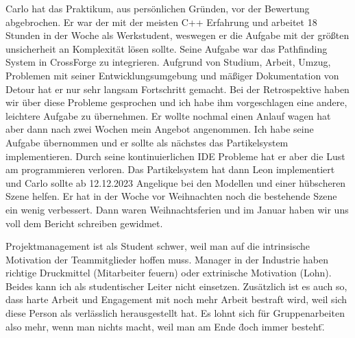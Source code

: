 Carlo hat das Praktikum, aus persönlichen Gründen, vor der Bewertung abgebrochen. Er war der mit der meisten C++ Erfahrung und arbeitet 18 Stunden in der Woche als Werkstudent, weswegen er die Aufgabe mit der größten unsicherheit an Komplexität lösen sollte. Seine Aufgabe war das Pathfinding System in CrossForge zu integrieren. Aufgrund von Studium, Arbeit, Umzug, Problemen mit seiner Entwicklungsumgebung und mäßiger Dokumentation von Detour hat er nur sehr langsam Fortschritt gemacht.  Bei der Retrospektive haben wir über diese Probleme gesprochen und ich habe ihm vorgeschlagen eine andere, leichtere Aufgabe zu übernehmen. Er wollte nochmal einen Anlauf wagen hat aber dann nach zwei Wochen mein Angebot angenommen. Ich habe seine Aufgabe übernommen und er sollte als nächstes das Partikelsystem implementieren. Durch seine kontinuierlichen IDE Probleme hat er aber die Lust am programmieren verloren. Das Partikelsystem hat dann Leon implementiert und Carlo sollte ab 12.12.2023 Angelique bei den Modellen und einer hübscheren Szene helfen. Er hat in der Woche vor Weihnachten noch die bestehende Szene ein wenig verbessert. Dann waren Weihnachtsferien und im Januar haben wir uns voll dem Bericht schreiben gewidmet.

Projektmanagement ist als Student schwer, weil man auf die intrinsische Motivation der Teammitglieder hoffen muss. Manager in der Industrie haben richtige Druckmittel (Mitarbeiter feuern) oder extrinische Motivation (Lohn). Beides kann ich als studentischer Leiter nicht einsetzen. Zusätzlich ist es auch so, dass harte Arbeit und Engagement mit noch mehr Arbeit bestraft wird, weil sich diese Person als verlässlich herausgestellt hat. Es lohnt sich für Gruppenarbeiten also mehr, wenn man nichts macht, weil man am Ende \"doch immer besteht\".